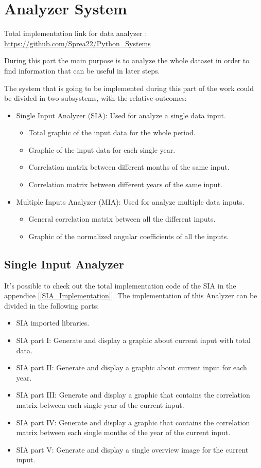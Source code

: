 
\chapter{Analyzer System}

Total implementation link for data analyzer : \\
\url{https://github.com/Sprea22/Python_Systems}

During this part the main purpose is to analyze the whole dataset in order to find information that can be useful in later steps. 

The system that is going to be implemented during this part of the work could be divided in two subsystems, with the relative outcomes:
\begin{itemize}
\item Single Input Analyzer (SIA): Used for analyze a single data input.
\begin{itemize}
\item Total graphic of the input data for the whole period.
\item Graphic of the input data for each single year.
\item Correlation matrix between different months of the same input.
\item Correlation matrix between different years of the same input.
\end{itemize}
\item Multiple Inputs Analyzer (MIA): Used for analyze multiple data inputs.
\begin{itemize}
\item General correlation matrix between all the different inputs.

\item Graphic of the normalized angular coefficients of all the inputs.
\end{itemize}
\end{itemize}

\newpage


\section{Single Input Analyzer}
It's possible to check out the total implementation code of the SIA in the appendice  [\ref{SIA_Implementation}].
The implementation of this Analyzer can be divided in the following parts:
\begin{itemize}
\item SIA imported libraries. 
\item SIA part I: Generate and display a graphic about current input with total data.
\item SIA part II: Generate and display a graphic about current input for each year.
\item SIA part III: Generate and display a graphic that contains the correlation matrix between each single year of the current input.
\item SIA part IV: Generate and display a graphic that contains the correlation matrix between each single months of the year of the current input.
\item SIA part V: Generate and display a single overview image for the current input.
\end{itemize}

